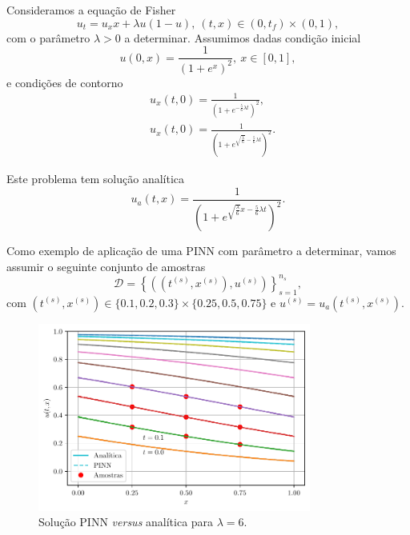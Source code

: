 \begin{ex}\label{cap_pinns_sec_param:ex:fisher}
  Consideramos a equação de Fisher{\fisher}
  \begin{equation}
    u_t = u_xx + \lambda u(1-u), ~(t,x)\in(0,t_f)\times(0,1),
  \end{equation}
  com o parâmetro $\lambda>0$ a determinar. Assumimos dadas condição inicial
  \begin{equation}
    u(0,x) = \frac{1}{\left(1+e^x\right)^2}, ~x\in[0,1],
  \end{equation}
  e condições de contorno
  \begin{align}
    &u_x(t,0) = \frac{1}{\left(1+e^{-\frac{5}{6}\lambda t}\right)^2},\\
    &u_x(t,0) = \frac{1}{\left(1+e^{\sqrt{\frac{\lambda}{6}}-\frac{5}{6}\lambda t}\right)^2}.
  \end{align}
  
  Este problema tem solução analítica \cite{Agirseven2010a}
  \begin{equation}
    u_a(t,x) = \frac{1}{\left(1+e^{\sqrt{\frac{\lambda}{6}}x-\frac{5}{6}\lambda t}\right)^2}.
  \end{equation}

  Como exemplo de aplicação de uma PINN com parâmetro a determinar, vamos assumir o seguinte conjunto de amostras
  \begin{equation}
    \mathcal{D} = \left\{\left(\left(t^{(s)},x^{(s)}\right),u^{(s)}\right)\right\}_{s=1}^{n_s},
  \end{equation}
  com $\left(t^{(s)},x^{(s)}\right)\in\{0.1, 0.2, 0.3\}\times\{0.25,0.5,0.75\}$ e $u^{(s)} = u_a\left(t^{(s)},x^{(s)}\right)$.

  \begin{figure}[H]
    \centering
    \includegraphics[width=0.8\textwidth]{cap_pinns/dados/ex_pinn_fisher/fig}
    \caption{Solução PINN \textit{versus} analítica para $\lambda = 6$.}
  \end{figure}


\end{ex}
